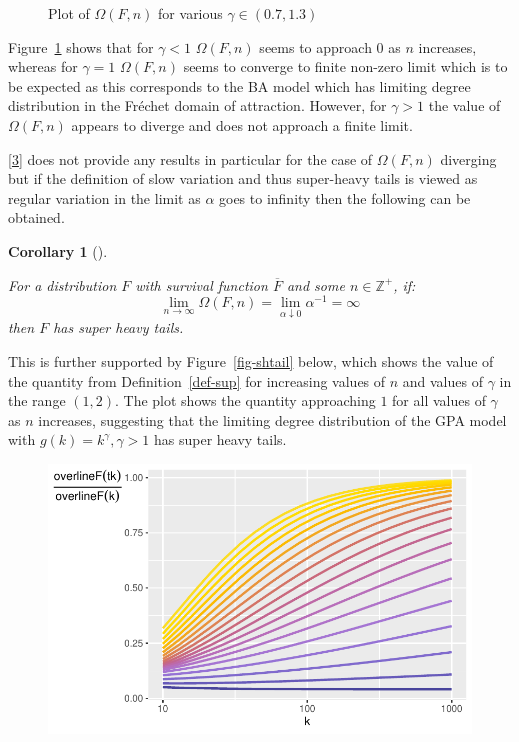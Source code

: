 \documentclass[
  10pt,
  a4paper,
]{scrreprt}
\theoremstyle{definition}
\theoremstyle{plain}
\newtheorem{corollary}{Corollary}[section]
\theoremstyle{plain}
\theoremstyle{plain}
\theoremstyle{remark}
\begin{document}
{\begin{figure}[H]
{}

\caption{\label{fig-omega}Plot of \(\Omega(F,n)\) for various
\(\gamma \in (0.7,1.3)\)}

\end{figure}

Figure~\ref{fig-omega} shows that for \(\gamma<1\) \(\Omega(F,n)\) seems
to approach 0 as \(n\) increases, whereas for \(\gamma=1\)
\(\Omega(F,n)\) seems to converge to finite non-zero limit which is to
be expected as this corresponds to the BA model which has limiting
degree distribution in the Fréchet domain of attraction. However, for
\(\gamma>1\) the value of \(\Omega(F,n)\) appears to diverge and does
not approach a finite limit.

{[}\protect\hyperlink{ref-shimura12}{3}{]} does not provide any results
in particular for the case of \(\Omega(F,n)\) diverging but if the
definition of slow variation and thus super-heavy tails is viewed as
regular variation in the limit as \(\alpha\) goes to infinity then the
following can be obtained.

\begin{corollary}[]\protect\hypertarget{cor-omg}{}\label{cor-omg}

For a distribution \(F\) with survival function \(\overline F\) and some
\(n\in\mathbb Z^+\), if: \[
\lim_{n\rightarrow\infty} \Omega(F,n) = \lim_{\alpha\downarrow0} \alpha^{-1} = \infty
\] then \(F\) has super heavy tails.

\end{corollary}

This is further supported by Figure~\ref{fig-shtail} below, which shows
the value of the quantity from Definition~\ref{def-sup} for increasing
values of \(n\) and values of \(\gamma\) in the range \((1,2)\). The
plot shows the quantity approaching \(1\) for all values of \(\gamma\)
as \(n\) increases, suggesting that the limiting degree distribution of
the GPA model with \(g(k) = k^\gamma,\gamma>1\) has super heavy tails.

\begin{figure}[H]

{\centering \includegraphics{doc_files/figure-pdf/fig-shtail-1.pdf}

}
\end{figure}}
\end{document}
